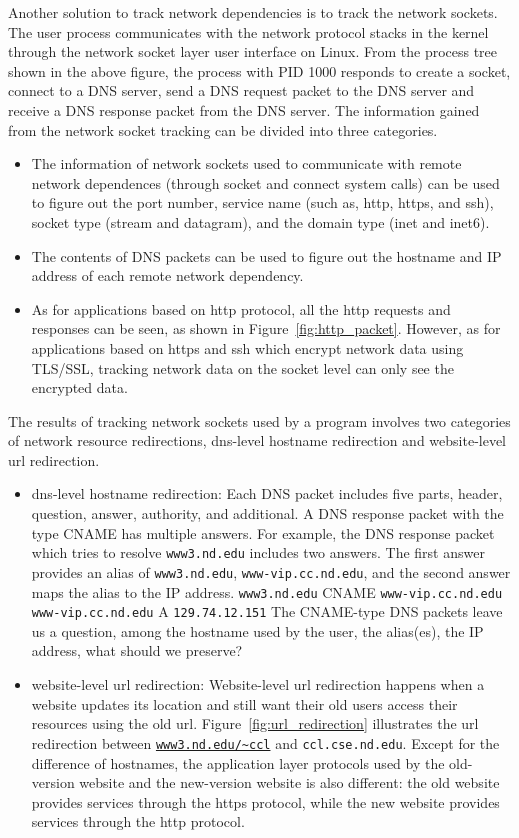 Another solution to track network dependencies is to track the network sockets. The user process communicates with the network protocol stacks in the kernel through the network socket layer user interface on Linux. From the process tree shown in the above figure, the process with PID 1000 responds to create a socket, connect to a DNS server, send a DNS request packet to the DNS server and receive a DNS response packet from the DNS server. The information gained from the network socket tracking can be divided into three categories.
\begin{itemize}
\item The information of network sockets used to communicate with remote network dependences (through socket and connect system calls) can be used to figure out the port number, service name (such as, http, https, and ssh), socket type (stream and datagram),  and the domain type (inet and inet6). 
\item The contents of DNS packets can be used to figure out the hostname and IP address of each remote network dependency. 
\item As for applications based on http protocol, all the http requests and responses can be seen, as shown in Figure~\ref{fig:http_packet}. However, as for applications based on https and ssh which encrypt network data using TLS/SSL, tracking network data on the socket level can only see the encrypted data. 
\end{itemize}

The results of tracking network sockets used by a program involves two categories of network resource redirections, dns-level hostname redirection and website-level url redirection. 
\begin{itemize}
\item dns-level hostname redirection: Each DNS packet includes five parts, header, question, answer, authority, and additional. A DNS response packet with the type CNAME has multiple answers. For example, the DNS response packet which tries to resolve {\tt www3.nd.edu} includes two answers. The first answer provides an alias of {\tt www3.nd.edu}, {\tt www-vip.cc.nd.edu}, and the second answer maps the alias to the IP address. 
{\tt www3.nd.edu} CNAME {\tt www-vip.cc.nd.edu}
{\tt www-vip.cc.nd.edu} A {\tt 129.74.12.151}
The CNAME-type DNS packets leave us a question, among the hostname used by the user, the alias(es), the IP address, what should we preserve?
\item website-level url redirection: Website-level url redirection happens when a website updates its location and still want their old users access their resources using the old url. Figure~\ref{fig:url_redirection} illustrates the url redirection between {\tt \url{www3.nd.edu/~ccl}} and {\tt ccl.cse.nd.edu}. Except for the difference of hostnames, the application layer protocols used by the old-version website and the new-version website is also different: the old website provides services through the https protocol, while the new website provides services through the http protocol. 
\end{itemize}

